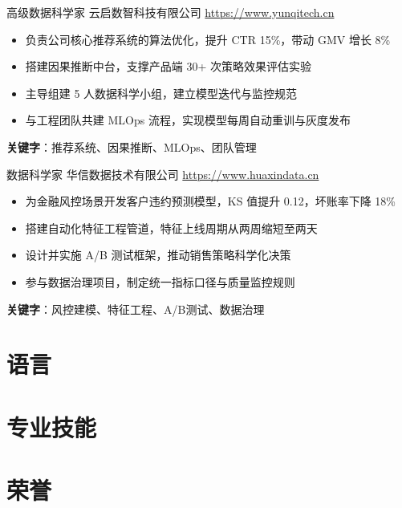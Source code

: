 \documentclass[a4paper, serif, 10pt]{moderncv}
\begin{document}
        {高级数据科学家}
        {云启数智科技有限公司}
        {\url{https://www.yunqitech.cn}}
        {}
        {\begin{itemize}
\item 负责公司核心推荐系统的算法优化，提升 CTR 15\%，带动 GMV 增长 8\%
\item 搭建因果推断中台，支撑产品端 30+ 次策略效果评估实验
\item 主导组建 5 人数据科学小组，建立模型迭代与监控规范
\item 与工程团队共建 MLOps 流程，实现模型每周自动重训与灰度发布
\end{itemize}
\textbf{关键字}：推荐系统、因果推断、MLOps、团队管理}

        {数据科学家}
        {华信数据技术有限公司}
        {\url{https://www.huaxindata.cn}}
        {}
        {\begin{itemize}
\item 为金融风控场景开发客户违约预测模型，KS 值提升 0.12，坏账率下降 18\%
\item 搭建自动化特征工程管道，特征上线周期从两周缩短至两天
\item 设计并实施 A/B 测试框架，推动销售策略科学化决策
\item 参与数据治理项目，制定统一指标口径与质量监控规则
\end{itemize}
\textbf{关键字}：风控建模、特征工程、A/B测试、数据治理}
\section{语言}

\section{专业技能}

\section{荣誉}
\end{document}
